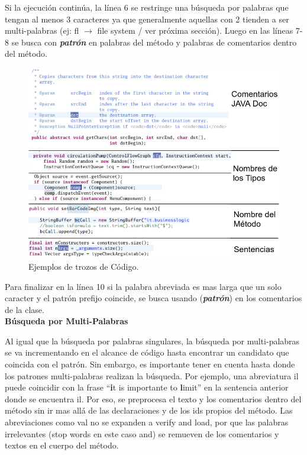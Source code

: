 \documentclass[a4paper,12pt]{report}
\begin{document}
Si la ejecución continúa, la línea 6 se restringe una búsqueda por palabras que tengan al menos 3 caracteres ya que generalmente aquellas con 2 tienden a ser multi-palabras (ej: \textsf{fl $\rightarrow$ file system} / ver próxima sección). Luego en las líneas 7-8 se busca con \textit{\textbf{patrón}} en palabras del método y palabras de comentarios dentro del método.

\begin{figure}[h] %
\centering
\includegraphics[scale=0.7]{./exp_3.png}
\caption{Ejemplos de trozos de Código.}
\label{exp3}
\end{figure}

Para finalizar en la línea 10 si la palabra abreviada es mas larga que un solo caracter y el patrón prefijo coincide, se busca usando (\textit{\textbf{patrón}}) en los comentarios de la clase.\\

\noindent \textbf{Búsqueda por Multi-Palabras\\}

Al igual que la búsqueda por palabras singulares, la búsqueda por multi-palabras se va incrementando en el alcance de código hasta encontrar un candidato que coincida con el patrón. Sin embargo, es importante tener en cuenta hasta donde los patrones multi-palabras realizan la búsqueda. Por ejemplo, una abreviatura \textsf{il} puede coincidir con la frase “\textbf{i}t is importante to \textbf{l}imit” en la sentencia anterior donde se encuentra \textsf{il}. Por eso, se preprocesa el texto y los comentarios dentro del método sin ir mas allá de las declaraciones y de los ids propios del método.
 Las abreviaciones como \textsf{val} no se expanden a \textsf{verify and load}, por que las palabras irrelevantes (stop words en este caso \textsf{and}) se remueven de los comentarios y textos en el cuerpo del método.
\end{document}
